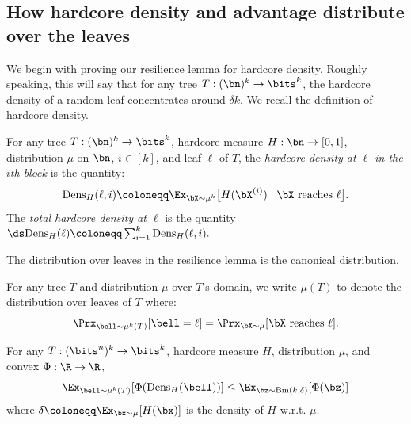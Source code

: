 \documentclass[11pt]{article}
\newcommand{\Bin}{\mathrm{Bin}}
\newcommand{\dens}{\mathrm{Dens}}
\newcommand{\Dens}{\mathrm{Dens}}
\begin{document}
\subsection{How hardcore density and advantage distribute over the leaves}
\label{subsec:understand-hardcore}
We begin with proving our resilience lemma for hardcore density. Roughly speaking, this will say that for any tree $T:(\bn)^k \to \bits^k$, the hardcore density of a random leaf concentrates around $\delta k$. We recall the definition of hardcore density.
\begin{definition}
\label{def:hardcore-density-body}
For any tree $T:(\bn)^k \to \bits^k$, hardcore measure $H:\bn \to [0,1]$, distribution $\mu$ on $\bn$, $i\in [k]$, and leaf $\ell$ of $T$, the {\sl hardcore density at $\ell$ in the $i$th block} is the quantity: 
\[ \Dens_H(\ell,i)\coloneqq \Ex_{\bX\sim \mu^k}\big[H(\bX^{(i)})\mid \text{$\bX$ reaches $\ell$}\big]. \]
The {\sl total hardcore density at $\ell$} is the quantity $\ds \Dens_H(\ell) \coloneqq \sum_{i =1}^k \Dens_H(\ell,i).$
\end{definition}
The distribution over leaves in the resilience lemma is the canonical distribution.
\begin{definition}
    \label{def:canonical-dist}
    For any tree $T$ and distribution $\mu$ over $T$'s domain, we write $\mu(T)$ to denote the distribution over leaves of $T$ where:  
\[ \Prx_{\bell\sim \mu^k(T)}[\bell = \ell] = \Prx_{\bX\sim \mu}[\text{$\bX$ reaches $\ell$}].\]
\end{definition}
\begin{lemma}
    \label{lem:resilience-general}
    For any $T:(\bits^n)^k \to \bits^k$, hardcore measure $H$, distribution $\mu$, and convex $\Phi:\R \to \R$,
    \begin{equation*}
        \Ex_{\bell \sim \mu^k(T)}[\Phi(\dens_H(\bell))] \leq \Ex_{\bz \sim \Bin(k,\delta)}[\Phi(\bz)]
    \end{equation*}
    where $\delta \coloneqq \Ex_{\bx \sim \mu}[H(\bx)]$ is the density of $H$ w.r.t. $\mu$.
\end{lemma}
\end{document}
